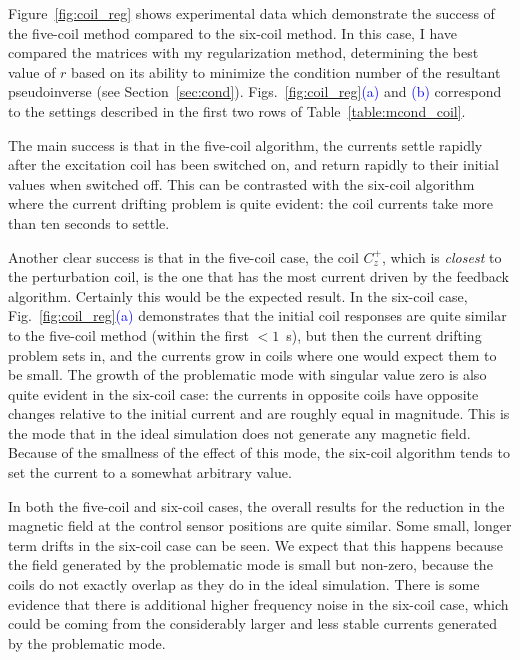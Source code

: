 Figure~\ref{fig:coil_reg} shows experimental data which demonstrate
the success of the five-coil method compared to the six-coil method.
In this case, I have compared the matrices with my regularization
method, determining the best value of $r$ based on its ability to
minimize the condition number of the resultant pseudoinverse (see
Section~\ref{sec:cond}).
Figs.~\ref{fig:coil_reg}\textcolor{blue}{(a)}
and \textcolor{blue}{(b)} correspond to the settings described in the
first two rows of Table~\ref{table:mcond_coil}.

The main success is that in the five-coil algorithm, the currents
settle rapidly after the excitation coil has been switched on, and
return rapidly to their initial values when switched off.  This can be
contrasted with the six-coil algorithm where the current drifting
problem is quite evident: the coil currents take more than ten seconds
to settle.

Another clear success is that in the five-coil case, the coil $C_z^+$,
which is {\it closest} to the perturbation coil, is the one that has
the most current driven by the feedback algorithm.  Certainly this
would be the expected result.  In the six-coil case,
Fig.~\ref{fig:coil_reg}\textcolor{blue}{(a)} demonstrates that the initial coil
responses are quite similar to the five-coil method (within the first
$<1$~s), but then the current drifting problem sets in, and the
currents grow in coils where one would expect them to be small.  The
growth of the problematic mode with singular value zero is also quite
evident in the six-coil case: the currents in opposite coils have
opposite changes relative to the initial current and are roughly equal
in magnitude.  This is the mode that in the ideal simulation does not
generate any magnetic field.  Because of the smallness of the effect
of this mode, the six-coil algorithm tends to set the current to a
somewhat arbitrary value.

In both the five-coil and six-coil cases, the overall results for the
reduction in the magnetic field at the control sensor positions are
quite similar.  Some small, longer term drifts in the six-coil case
can be seen.  We expect that this happens because the field generated
by the problematic mode is small but non-zero, because the coils do
not exactly overlap as they do in the ideal simulation.  There is some
evidence that there is additional higher frequency noise in the
six-coil case, which could be coming from the considerably larger and
less stable currents generated by the problematic mode.


